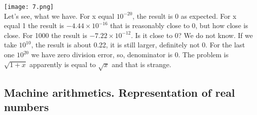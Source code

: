 \documentclass{article}
\begin{document}
\texttt{[image: 7.png]}\\
Let's see, what we have. For x equal \(10^{-20}\), the result is 0 as expected. For x equal 1 the result is \(-4.44 \times 10^{-16}\) that is reasonably close to 0, but how close is close. For 1000 the result is \(-7.22 \times 10^{-12}\). Is it close to 0? We do not know. If we take \(10^{10}\), the result is about 0.22, it is still larger, definitely not 0. For the last one \(10^{20}\) we have zero division error, so, denominator is 0. The problem is \(\sqrt{1 + x}\) apparently is equal to \(\sqrt{x}\) and that is strange.

\subsection{Machine arithmetics. Representation of real numbers}
\end{document}
